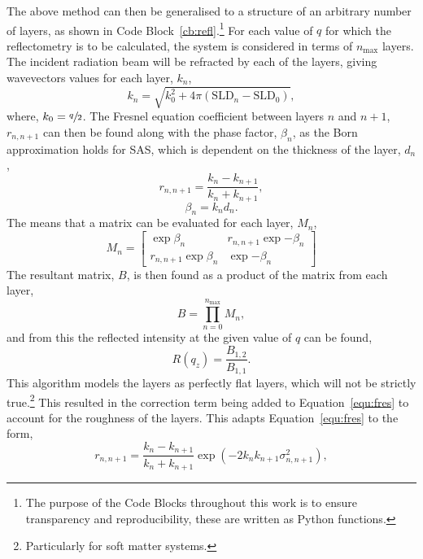 The above method can then be generalised to a structure of an arbitrary number of layers, as shown in Code Block~\ref{cb:refl}.\footnote{The purpose of the Code Blocks throughout this work is to ensure transparency and reproducibility, these are written as Python functions.}
For each value of $q$ for which the reflectometry is to be calculated, the system is considered in terms of $n_{\text{max}}$ layers.
The incident radiation beam will be refracted by each of the layers, giving wavevectors values for each layer, $k_n$,
%
\begin{equation}
    k_n = \sqrt{k_0^2 + 4\pi (\text{SLD}_n - \text{SLD}_0)},
\end{equation}
%
where, $k_0=\sfrac{q}{2}$.
The Fresnel equation coefficient between layers $n$ and $n+1$, $r_{n,n+1}$ can then be found along with the phase factor, $\beta_n$, as the Born approximation holds for SAS, which is dependent on the thickness of the layer, $d_n$,
%
\begin{equation}
    r_{n,n+1} = \frac{k_n - k_{n+1}}{k_n + k_{n+1}},
    \label{equ:fres}
\end{equation}
%
%
\begin{equation}
    \beta_n = k_n d_n.
\end{equation}
%
The means that a matrix can be evaluated for each layer, $M_n$,
%
\begin{equation}
    M_n =
    \begin{bmatrix}
        \exp{\beta_n} & r_{n,n+1}\exp{-\beta_n} \\ r_{n,n+1}\exp{\beta_n} & \exp{-\beta_n}
    \end{bmatrix}
\end{equation}
%
The resultant matrix, $B$, is then found as a product of the matrix from each layer,
%
\begin{equation}
    B = \prod_{n=0}^{n_{\text{max}}} M_n,
\end{equation}
%
and from this the reflected intensity at the given value of $q$ can be found,
%
\begin{equation}
    R(q_z) = \frac{B_{1,2}}{B_{1,1}}.
\end{equation}
%
This algorithm models the layers as perfectly flat layers, which will not be strictly true.\footnote{Particularly for soft matter systems.}
This resulted in the correction term being added to Equation~\ref{equ:fres} to account for the roughness of the layers.
This adapts Equation~\ref{equ:fres} to the form,
%
\begin{equation}
    r_{n,n+1} = \frac{k_n - k_{n+1}}{k_n + k_{n+1}}\exp{(-2k_nk_{n+1}\sigma^2_{n,n+1})},
\end{equation}
